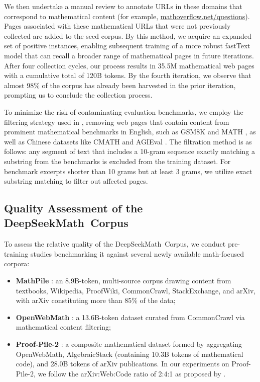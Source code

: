 We then undertake a manual review to annotate URLs in these domains that correspond to mathematical content (for example, \url{mathoverflow.net/questions}). Pages associated with these mathematical URLs that were not previously collected are added to the seed corpus. By this method, we acquire an expanded set of positive instances, enabling subsequent training of a more robust fastText model that can recall a broader range of mathematical pages in future iterations. After four collection cycles, our process results in 35.5M mathematical web pages with a cumulative total of 120B tokens. By the fourth iteration, we observe that almost 98\% of the corpus has already been harvested in the prior iteration, prompting us to conclude the collection process.

To minimize the risk of contaminating evaluation benchmarks, we employ the filtering strategy used in \cite{deepseek-coder}, removing web pages that contain content from prominent mathematical benchmarks in English, such as GSM8K \citep{gsm8k} and MATH \citep{MATH}, as well as Chinese datasets like CMATH \citep{wei2023cmath} and AGIEval \citep{agieval}. The filtration method is as follows: any segment of text that includes a 10-gram sequence exactly matching a substring from the benchmarks is excluded from the training dataset. For benchmark excerpts shorter than 10 grams but at least 3 grams, we utilize exact substring matching to filter out affected pages.

\subsection{Quality Assessment of the DeepSeekMath~Corpus}

To assess the relative quality of the DeepSeekMath~Corpus, we conduct pre-training studies benchmarking it against several newly available math-focused corpora:

\begin{itemize}[topsep=0pt]
    \item \textbf{MathPile} \citep{mathpile}: an 8.9B-token, multi-source corpus drawing content from textbooks, Wikipedia, ProofWiki, CommonCrawl, StackExchange, and arXiv, with arXiv constituting more than 85\% of the data;
    \item \textbf{OpenWebMath} \citep{openwebmath}: a 13.6B-token dataset curated from CommonCrawl via mathematical content filtering;
    \item \textbf{Proof-Pile-2} \citep{llemma}: a composite mathematical dataset formed by aggregating OpenWebMath, AlgebraicStack (containing 10.3B tokens of mathematical code), and 28.0B tokens of arXiv publications. In our experiments on Proof-Pile-2, we follow the arXiv:Web:Code ratio of 2:4:1 as proposed by \cite{llemma}.
\end{itemize}

